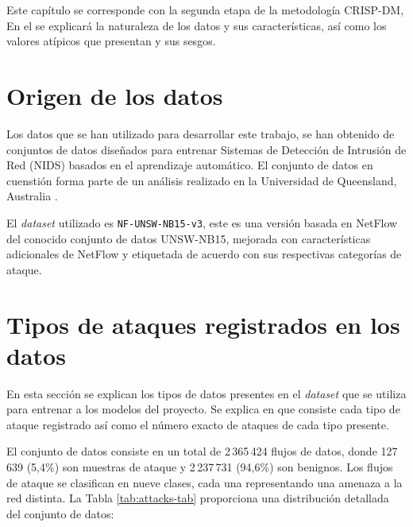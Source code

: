 Este capítulo se corresponde con la segunda etapa de la metodología CRISP-DM, En el se explicará la naturaleza de los datos y sus características, así como los valores atípicos que presentan y sus sesgos.

\section{Origen de los datos}  \label{sec.origen-datos}
Los datos que se han utilizado para desarrollar este trabajo, se han obtenido de  conjuntos de datos diseñados para entrenar Sistemas de Detección de Intrusión de Red (NIDS) basados en el aprendizaje automático. El conjunto de datos en cuenstión  forma parte de un análisis realizado en la Universidad de Queensland, Australia \cite{luay2025NetFlowDatasetsV3}.


El \textit{dataset} utilizado es \texttt{NF-UNSW-NB15-v3}, este es una versión basada en NetFlow del conocido conjunto de datos UNSW-NB15, mejorada con características adicionales de NetFlow y etiquetada de acuerdo con sus respectivas categorías de ataque. 

\section{Tipos de ataques registrados en los datos} \label{sec.tipo-ataques}
En esta sección se explican los tipos de datos presentes en el \textit{dataset} que se utiliza para entrenar a los modelos del proyecto. Se explica en que consiste cada tipo de ataque registrado así como el número exacto de ataques de cada tipo presente.

El conjunto de datos consiste en un total de 2\,365\,424 flujos de datos, donde 127\,639 (5,4\%) son muestras de ataque y 2\,237\,731 (94,6\%) son benignos. Los flujos de ataque se clasifican en nueve clases, cada una representando una amenaza a la red distinta. La Tabla \ref{tab:attacks-tab} proporciona una distribución detallada del conjunto de datos:

